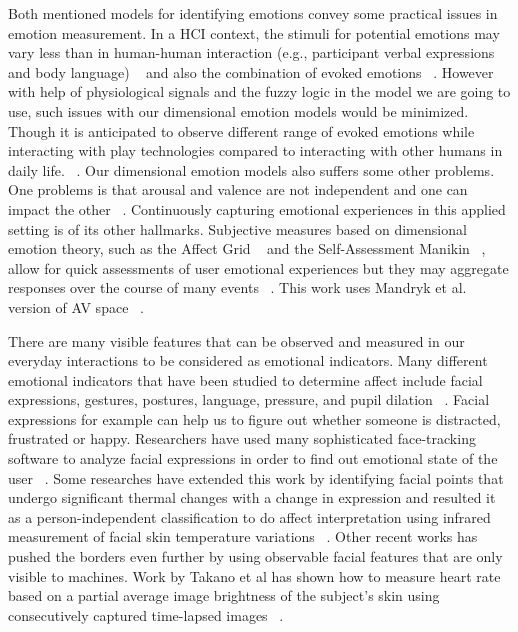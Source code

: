 Both mentioned models for identifying emotions convey some practical issues in emotion measurement. In a HCI context, the stimuli for potential emotions may vary less than in human-human interaction (e.g., participant verbal expressions and body language) ~\cite{zhang2010service} and also the combination of evoked emotions ~\cite{peter2006emotion}. However with help of physiological signals and the fuzzy logic in the model we are going to use, such issues with our dimensional emotion models would be minimized. Though it is anticipated to observe different range of evoked emotions while interacting with play technologies compared to interacting with other humans in daily life. ~\cite{zhang2010service}. Our dimensional emotion models also suffers some other problems. One problems is that arousal and valence are not independent and one can impact the other ~\cite{mandryk2007fuzzy}. Continuously capturing emotional experiences in this applied setting is of its other hallmarks. Subjective measures based on dimensional emotion theory, such as the Affect Grid ~\cite{russell1989affect} and the Self-Assessment Manikin ~\cite{bradley1994measuring}, allow for quick assessments of user emotional experiences but they may aggregate responses over the course of many events ~\cite{zhang2010service}. This work uses Mandryk et al. version of AV space ~\cite{mandryk2007fuzzy}.

There are many visible features that can be observed and measured in our everyday interactions to be considered as emotional indicators. Many different emotional indicators that have been studied to determine affect include facial expressions, gestures, postures, language, pressure, and pupil dilation ~\cite{picard2003affective}. Facial expressions for example can help us to figure out whether someone is distracted, frustrated or happy. Researchers have used many sophisticated face-tracking software to analyze facial expressions in order to find out emotional state of the user ~\cite{partala2006real, sebe2006emotion}. Some researches have extended this work by identifying facial points that undergo significant thermal changes with a change in expression and resulted it as a person-independent classification to do affect interpretation using infrared measurement of facial skin temperature variations ~\cite{khan2006automated}. Other recent works has pushed the borders even further by using observable facial features that are only visible to machines. Work by Takano et al has shown how to measure heart rate based on a partial average image brightness of the subject's skin using consecutively captured time-lapsed images ~\cite{takano2007heart}.

